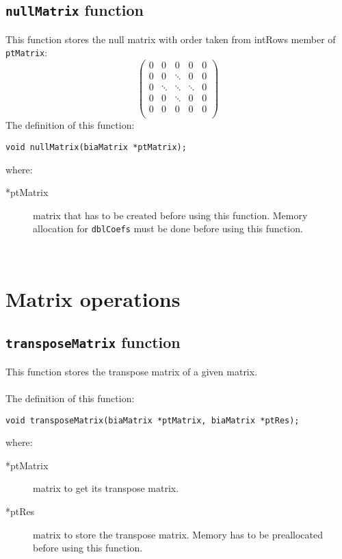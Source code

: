 \subsection{\texttt{nullMatrix} function}

This function stores the null matrix with order taken from intRows member of \texttt{ptMatrix}:
%
\begin{displaymath}
  \left( \begin{array}{ccccc}
    0 & 0 & 0 & 0 & 0 \\
    0 & 0 & \ddots & 0 & 0 \\
    0 & \ddots & \ddots & \ddots & 0 \\
    0 & 0 & \ddots & 0 & 0 \\
    0 & 0 & 0 & 0 & 0 \\
  \end{array} \right)
\end{displaymath}
%
The definition of this function:
%
\begin{verbatim}
void nullMatrix(biaMatrix *ptMatrix);  
\end{verbatim}
%
where:
%
\begin{description}
\item[*ptMatrix] matrix that has to be created before using this function. Memory allocation for \texttt{dblCoefs} must be done before using this function.
\end{description}
%
\ \\
%

\section{Matrix operations}

\subsection{\texttt{transposeMatrix} function}

This function stores the transpose matrix of a given matrix.\\ \\
%
The definition of this function:
%
\begin{verbatim}
void transposeMatrix(biaMatrix *ptMatrix, biaMatrix *ptRes);  
\end{verbatim}
%
where:
%
\begin{description}
\item[*ptMatrix] matrix to get its transpose matrix.
\item[*ptRes] matrix to store the transpose matrix. Memory has to be preallocated before using this function.
\end{description}
%
\ \\
%

